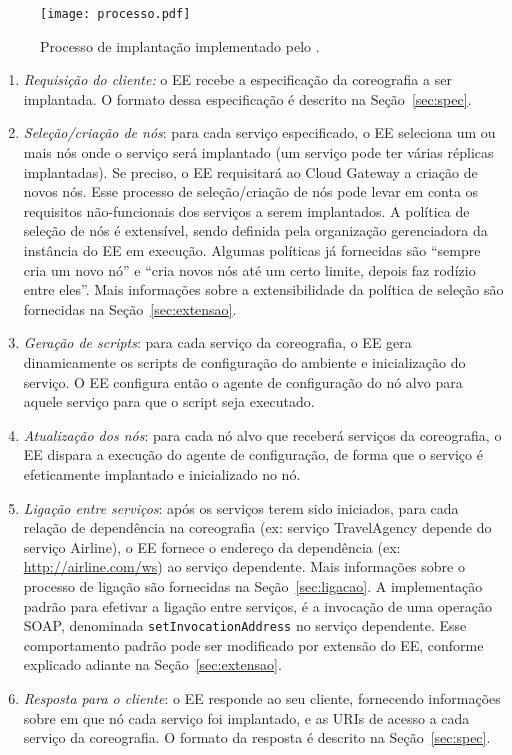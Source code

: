 \begin{figure}[ht]
\centering
\texttt{[image: processo.pdf]}
\caption{Processo de implantação implementado pelo \ee.}
\label{fig:processo}
\end{figure}

\begin{enumerate}

\item \emph{Requisição do cliente:} o EE recebe a especificação da coreografia a ser implantada.
O formato dessa especificação é descrito na Seção~\ref{sec:spec}.

\item \emph{Seleção/criação de nós}: para cada serviço especificado, o EE seleciona um ou mais nós 
onde o serviço será implantado (um serviço pode ter várias réplicas implantadas). 
Se preciso, o EE requisitará ao Cloud Gateway a criação de novos nós.
Esse processo de seleção/criação de nós pode levar em conta os requisitos não-funcionais
dos serviços a serem implantados.
A política de seleção de nós é extensível, sendo definida pela organização
gerenciadora da instância do EE em execução. Algumas políticas já fornecidas são
``sempre cria um novo nó'' e ``cria novos nós até um certo limite, depois faz rodízio entre eles''.
Mais informações sobre a extensibilidade da política de seleção
são fornecidas na Seção~\ref{sec:extensao}.

\item \emph{Geração de scripts}: para cada serviço da coreografia, o EE gera dinamicamente os scripts de configuração do ambiente e inicialização do serviço. 
O EE configura então o agente de configuração do nó alvo para aquele serviço 
para que o script seja executado.

\item \emph{Atualização dos nós}: para cada nó alvo que receberá serviços da coreografia,
o EE dispara a execução do agente de configuração, de forma que o serviço é efeticamente
implantado e inicializado no nó.

\item \emph{Ligação entre serviços}: após os serviços terem sido iniciados, 
para cada relação de dependência na coreografia (ex: serviço \textsf{TravelAgency}
depende do serviço \textsf{Airline}), o EE fornece o endereço da dependência 
(ex: \url{http://airline.com/ws}) ao serviço dependente.
Mais informações sobre o processo de ligação são fornecidas na Seção~\ref{sec:ligacao}.
A implementação padrão para efetivar a ligação entre serviços, é a invocação de uma
operação SOAP, denominada \texttt{setInvocationAddress} no serviço dependente. 
Esse comportamento padrão pode ser modificado por extensão do EE,
conforme explicado adiante na Seção~\ref{sec:extensao}.

\item \emph{Resposta para o cliente}: o EE responde ao seu cliente,
fornecendo informações sobre em que nó cada serviço foi implantado,
e as URIs de acesso a cada serviço da coreografia.
O formato da resposta é descrito na Seção~\ref{sec:spec}.

\end{enumerate}

